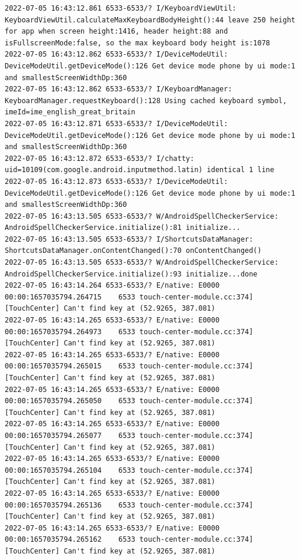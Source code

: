 \documentclass[a4paper,12pt]{book}
\begin{document}
\begin{lstlisting}
2022-07-05 16:43:12.861 6533-6533/? I/KeyboardViewUtil: KeyboardViewUtil.calculateMaxKeyboardBodyHeight():44 leave 250 height for app when screen height:1416, header height:88 and isFullscreenMode:false, so the max keyboard body height is:1078
2022-07-05 16:43:12.862 6533-6533/? I/DeviceModeUtil: DeviceModeUtil.getDeviceMode():126 Get device mode phone by ui mode:1 and smallestScreenWidthDp:360
2022-07-05 16:43:12.862 6533-6533/? I/KeyboardManager: KeyboardManager.requestKeyboard():128 Using cached keyboard symbol, imeId=ime_english_great_britain
2022-07-05 16:43:12.871 6533-6533/? I/DeviceModeUtil: DeviceModeUtil.getDeviceMode():126 Get device mode phone by ui mode:1 and smallestScreenWidthDp:360
2022-07-05 16:43:12.872 6533-6533/? I/chatty: uid=10109(com.google.android.inputmethod.latin) identical 1 line
2022-07-05 16:43:12.873 6533-6533/? I/DeviceModeUtil: DeviceModeUtil.getDeviceMode():126 Get device mode phone by ui mode:1 and smallestScreenWidthDp:360
2022-07-05 16:43:13.505 6533-6533/? W/AndroidSpellCheckerService: AndroidSpellCheckerService.initialize():81 initialize...
2022-07-05 16:43:13.505 6533-6533/? I/ShortcutsDataManager: ShortcutsDataManager.onContentChanged():70 onContentChanged()
2022-07-05 16:43:13.505 6533-6533/? W/AndroidSpellCheckerService: AndroidSpellCheckerService.initialize():93 initialize...done
2022-07-05 16:43:14.264 6533-6533/? E/native: E0000 00:00:1657035794.264715    6533 touch-center-module.cc:374] [TouchCenter] Can't find key at (52.9265, 387.081)
2022-07-05 16:43:14.265 6533-6533/? E/native: E0000 00:00:1657035794.264973    6533 touch-center-module.cc:374] [TouchCenter] Can't find key at (52.9265, 387.081)
2022-07-05 16:43:14.265 6533-6533/? E/native: E0000 00:00:1657035794.265015    6533 touch-center-module.cc:374] [TouchCenter] Can't find key at (52.9265, 387.081)
2022-07-05 16:43:14.265 6533-6533/? E/native: E0000 00:00:1657035794.265050    6533 touch-center-module.cc:374] [TouchCenter] Can't find key at (52.9265, 387.081)
2022-07-05 16:43:14.265 6533-6533/? E/native: E0000 00:00:1657035794.265077    6533 touch-center-module.cc:374] [TouchCenter] Can't find key at (52.9265, 387.081)
2022-07-05 16:43:14.265 6533-6533/? E/native: E0000 00:00:1657035794.265104    6533 touch-center-module.cc:374] [TouchCenter] Can't find key at (52.9265, 387.081)
2022-07-05 16:43:14.265 6533-6533/? E/native: E0000 00:00:1657035794.265136    6533 touch-center-module.cc:374] [TouchCenter] Can't find key at (52.9265, 387.081)
2022-07-05 16:43:14.265 6533-6533/? E/native: E0000 00:00:1657035794.265162    6533 touch-center-module.cc:374] [TouchCenter] Can't find key at (52.9265, 387.081)

\end{lstlisting}
\end{document}
